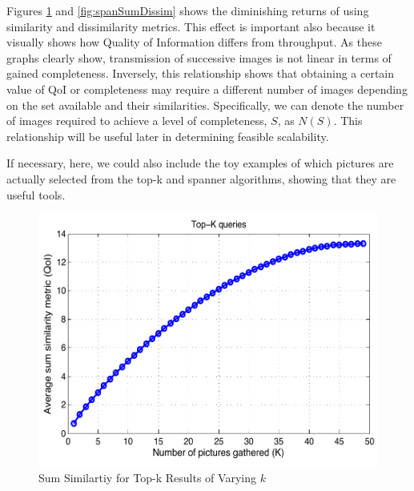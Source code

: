 Figures \ref{fig:topkSumSim} and \ref{fig:spanSumDissim} shows the diminishing returns of using similarity and dissimilarity metrics.  This effect is important also because it visually shows how Quality of Information differs from throughput.  As these graphs clearly show, transmission of successive images is not linear in terms of gained completeness.  Inversely, this relationship shows that obtaining a certain value of QoI or completeness may require a different number of images depending on the set available and their similarities.  Specifically, we can denote the number of images required to achieve a level of completeness, $S$, as $N(S)$.  This relationship will be useful later in determining feasible scalability.


If necessary, here, we could also include the toy examples of which pictures are actually selected from the top-k and spanner algorithms, showing that they are useful tools.




\begin{figure} 
\begin{centering}
    \includegraphics[scale=0.45]{figures/topkSumSimilarity.pdf}
    \caption{Sum Similartiy for Top-k Results of Varying $k$}
    \label{fig:topkSumSim}
\end{centering}
\end{figure}

